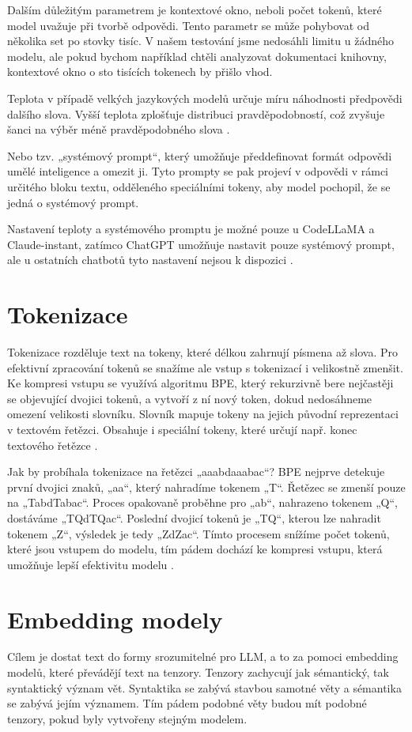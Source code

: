 \documentclass[FM,DP]{tulthesis}
\begin{document}
		Dalším důležitým parametrem je kontextové okno, neboli počet tokenů, které model uvažuje při tvorbě odpovědi. Tento parametr se může pohybovat od několika set po stovky tisíc. V našem testování jsme nedosáhli limitu u žádného modelu, ale pokud bychom například chtěli analyzovat dokumentaci knihovny, kontextové okno o sto tisících tokenech by přišlo vhod. 
		
		Teplota v případě velkých jazykových modelů určuje míru náhodnosti předpovědi dalšího slova. Vyšší teplota zplošťuje distribuci pravděpodobností, což zvyšuje šanci na výběr méně pravděpodobného slova \cite{llm_parameters}.
		
		Nebo tzv. „systémový prompt“, který umožňuje předdefinovat formát odpovědi umělé inteligence a omezit ji. Tyto prompty se pak projeví v odpovědi v rámci určitého bloku textu, odděleného speciálními tokeny, aby model pochopil, že se jedná o systémový prompt. 
		
		Nastavení teploty a systémového promptu je možné pouze u CodeLLaMA a Claude-instant, zatímco ChatGPT umožňuje nastavit pouze systémový prompt, ale u ostatních chatbotů tyto nastavení nejsou k dispozici \cite{llm_parameters}.
		
		\section{Tokenizace}
		Tokenizace rozděluje text na tokeny, které délkou zahrnují písmena až slova. Pro efektivní zpracování tokenů se snažíme ale vstup s tokenizací i velikostně zmenšit. Ke kompresi vstupu se využívá algoritmu BPE, který rekurzivně bere nejčastěji se objevující dvojici tokenů, a vytvoří z ní nový token, dokud nedosáhneme omezení velikosti slovníku. Slovník mapuje tokeny na jejich původní reprezentaci v textovém řetězci. Obsahuje i speciální tokeny, které určují např. konec textového řetězce \cite{rothman2021transformers}. 
		
		Jak by probíhala tokenizace na řetězci „aaabdaaabac“? BPE nejprve detekuje první dvojici znaků, „aa“, který nahradíme tokenem „T“. Řetězec se zmenší pouze na „TabdTabac“. Proces opakovaně proběhne pro „ab“, nahrazeno tokenem „Q“, dostáváme „TQdTQac“. Poslední dvojicí tokenů je „TQ“, kterou lze nahradit tokenem „Z“, výsledek je tedy „ZdZac“. Tímto procesem snížíme počet tokenů, které jsou vstupem do modelu, tím pádem dochází ke kompresi vstupu, která umožňuje lepší efektivitu modelu \cite{rothman2021transformers}.
		
		\section{Embedding modely}
		Cílem je dostat text do formy srozumitelné pro LLM, a to za pomoci embedding modelů, které převádějí text na tenzory. Tenzory zachycují jak sémantický, tak syntaktický význam vět. Syntaktika se zabývá stavbou samotné věty a sémantika se zabývá jejím významem. Tím pádem podobné věty budou mít podobné tenzory, pokud byly vytvořeny stejným modelem.
		
\end{document}

